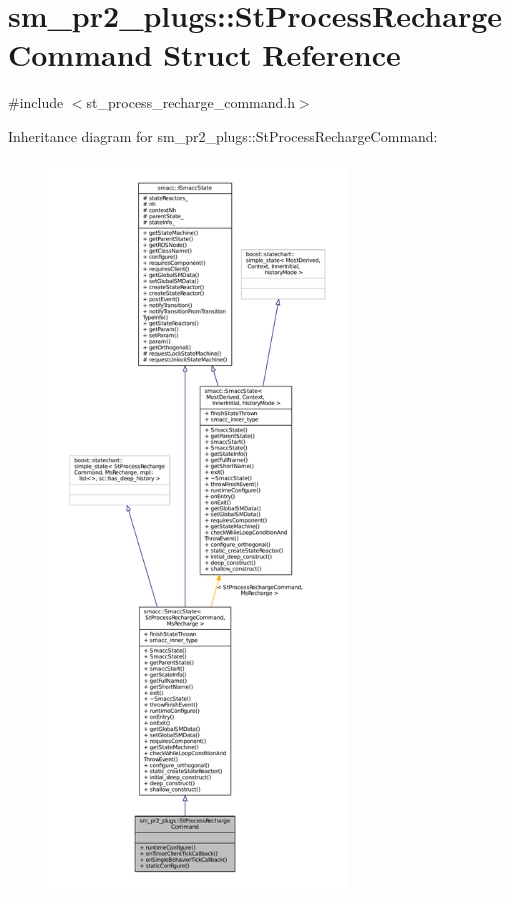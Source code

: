\hypertarget{structsm__pr2__plugs_1_1StProcessRechargeCommand}{}\section{sm\+\_\+pr2\+\_\+plugs\+:\+:St\+Process\+Recharge\+Command Struct Reference}
\label{structsm__pr2__plugs_1_1StProcessRechargeCommand}


{\ttfamily \#include $<$st\+\_\+process\+\_\+recharge\+\_\+command.\+h$>$}



Inheritance diagram for sm\+\_\+pr2\+\_\+plugs\+:\+:St\+Process\+Recharge\+Command\+:
\nopagebreak
\begin{figure}[H]
\begin{center}
\leavevmode
\includegraphics[height=550pt]{structsm__pr2__plugs_1_1StProcessRechargeCommand__inherit__graph}
\end{center}
\end{figure}


